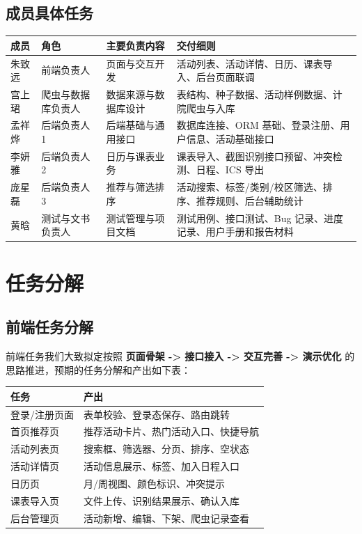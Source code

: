 \documentclass[UTF8,a4paper,12pt,fontset=none]{ctexrep}
\begin{document}
\section{成员具体任务}
\begin{longtable}{|p{}|p{}|p{}|p{}|}
\hline
\textbf{成员} & \textbf{角色} & \textbf{主要负责内容} & \textbf{交付细则} \\
\hline
朱致远 & 前端负责人 & 页面与交互开发 & 活动列表、活动详情、日历、课表导入、后台页面联调 \\
\hline
宫上珺 & 爬虫与数据库负责人 & 数据来源与数据库设计 & 表结构、种子数据、活动样例数据、计院爬虫与入库 \\
\hline
孟祥烨 & 后端负责人 1 & 后端基础与通用接口 & 数据库连接、ORM 基础、登录注册、用户信息、活动基础接口 \\
\hline
李妍雅 & 后端负责人 2 & 日历与课表业务 & 课表导入、截图识别接口预留、冲突检测、日程、ICS 导出 \\
\hline
庞星磊 & 后端负责人 3 & 推荐与筛选排序 & 活动搜索、标签/类别/校区筛选、排序、推荐规则、后台辅助统计 \\
\hline
黄晗 & 测试与文书负责人 & 测试管理与项目文档 & 测试用例、接口测试、Bug 记录、进度记录、用户手册和报告材料 \\
\hline
\end{longtable}

\chapter{任务分解}

\section{前端任务分解}
前端任务我们大致拟定按照 \textbf{页面骨架 -> 接口接入 -> 交互完善 -> 演示优化} 的思路推进，预期的任务分解和产出如下表：

\begin{longtable}{|p{}|p{}|}
\hline
\textbf{任务} & \textbf{产出} \\
\hline
登录/注册页面 & 表单校验、登录态保存、路由跳转 \\
\hline
首页推荐页 & 推荐活动卡片、热门活动入口、快捷导航 \\
\hline
活动列表页 & 搜索框、筛选器、分页、排序、空状态 \\
\hline
活动详情页 & 活动信息展示、标签、加入日程入口 \\
\hline
日历页 & 月/周视图、颜色标识、冲突提示 \\
\hline
课表导入页 & 文件上传、识别结果展示、确认入库 \\
\hline
后台管理页 & 活动新增、编辑、下架、爬虫记录查看 \\
\hline
\end{longtable}
\end{document}
